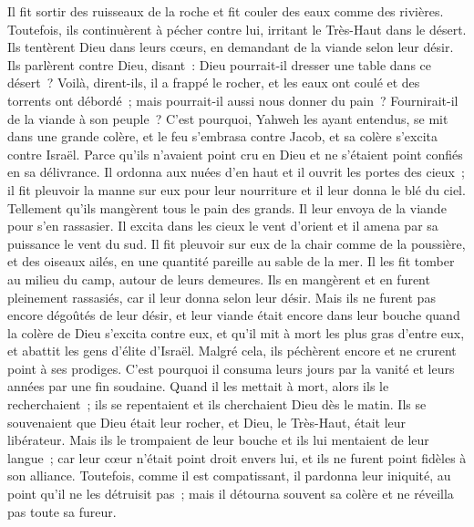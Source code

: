 \begin{multicols}{2}
Il fit sortir des ruisseaux de la roche et fit couler des eaux comme des rivières.
Toutefois, ils continuèrent à pécher contre lui, irritant le Très-Haut dans le désert.
Ils tentèrent Dieu dans leurs cœurs, en demandant de la viande selon leur désir.
Ils parlèrent contre Dieu, disant~: Dieu pourrait-il dresser une table dans ce désert~?
Voilà, dirent-ils, il a frappé le rocher, et les eaux ont coulé et des torrents ont débordé~; mais pourrait-il aussi nous donner du pain~? Fournirait-il de la viande à son peuple~?
C'est pourquoi, Yahweh les ayant entendus, se mit dans une grande colère, et le feu s'embrasa contre Jacob, et sa colère s'excita contre Israël.
Parce qu'ils n'avaient point cru en Dieu et ne s'étaient point confiés en sa délivrance.
Il ordonna aux nuées d'en haut et il ouvrit les portes des cieux~;
il fit pleuvoir la manne sur eux pour leur nourriture et il leur donna le blé du ciel.
Tellement qu'ils mangèrent tous le pain des grands. Il leur envoya de la viande pour s'en rassasier.
Il excita dans les cieux le vent d'orient et il amena par sa puissance le vent du sud.
Il fit pleuvoir sur eux de la chair comme de la poussière, et des oiseaux ailés, en une quantité pareille au sable de la mer.
Il les fit tomber au milieu du camp, autour de leurs demeures.
Ils en mangèrent et en furent pleinement rassasiés, car il leur donna selon leur désir.
Mais ils ne furent pas encore dégoûtés de leur désir, et leur viande était encore dans leur bouche
quand la colère de Dieu s'excita contre eux, et qu'il mit à mort les plus gras d'entre eux, et abattit les gens d'élite d'Israël.
Malgré cela, ils péchèrent encore et ne crurent point à ses prodiges.
C'est pourquoi il consuma leurs jours par la vanité et leurs années par une fin soudaine.
Quand il les mettait à mort, alors ils le recherchaient~; ils se repentaient et ils cherchaient Dieu dès le matin.
Ils se souvenaient que Dieu était leur rocher, et Dieu, le Très-Haut, était leur libérateur.
Mais ils le trompaient de leur bouche et ils lui mentaient de leur langue~;
car leur cœur n'était point droit envers lui, et ils ne furent point fidèles à son alliance.
Toutefois, comme il est compatissant, il pardonna leur iniquité, au point qu'il ne les détruisit pas~; mais il détourna souvent sa colère et ne réveilla pas toute sa fureur.

\end{multicols}
